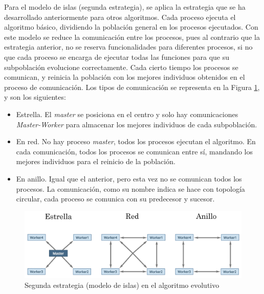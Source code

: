 	Para el modelo de islas (segunda estrategia), se aplica la estrategia que se ha desarrollado anteriormente para otros algoritmos. Cada proceso ejecuta el algoritmo básico, dividiendo la población general en los procesos ejecutados. Con este modelo se reduce la comunicación entre los procesos, pues al contrario que la estrategia anterior, no se reserva funcionalidades para diferentes procesos, si no que cada proceso se encarga de ejecutar todas las funciones para que su subpoblación evolucione correctamente. Cada cierto tiempo los procesos se comunican, y reinicia la población con los mejores individuos obtenidos en el proceso de comunicación. Los tipos de comunicación se representa en la Figura \ref{fig:pev3_mpi2}, y son los siguientes: 

	\begin{itemize}
		\item Estrella. El \textit{master} se posiciona en el centro y solo hay comunicaciones \textit{Master-Worker} para almacenar los mejores individuos de cada subpoblación.
		\item En red. No hay proceso \textit{master}, todos los procesos ejecutan el algoritmo. En cada comunicación, todos los procesos se comunican entre sí, mandando los mejores individuos para el reinicio de la población.
		\item En anillo. Igual que el anterior, pero esta vez no se comunican todos los procesos. La comunicación, como su nombre indica se hace con topología circular, cada proceso se comunica con su predecesor y sucesor.
	\end{itemize}
	
	\begin{figure}[!h]
		\centering
		\includegraphics[width=\textwidth]{images/chapter_3/pev_mpi2}
		\caption{Segunda estrategia (modelo de islas) en el algoritmo evolutivo}
		\label{fig:pev3_mpi2}
	\end{figure}
	
